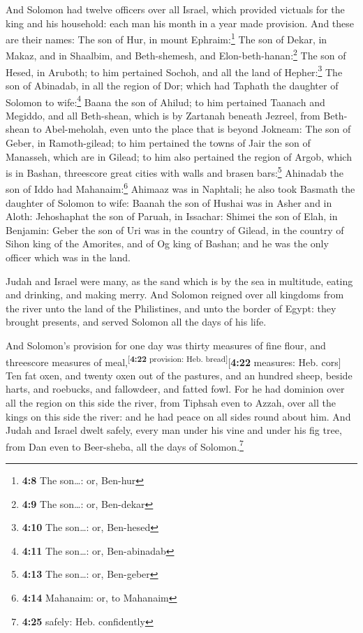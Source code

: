  And Solomon had twelve officers over all Israel, which
provided victuals for the king and his household: each man his month in
a year made provision.  And these are their names: The son
of Hur, in mount Ephraim:\footnote{\textbf{4:8} The son\ldots: or,
  Ben-hur}  The son of Dekar, in Makaz, and in Shaalbim,
and Beth-shemesh, and Elon-beth-hanan:\footnote{\textbf{4:9} The
  son\ldots: or, Ben-dekar}  The son of Hesed, in
Aruboth; to him pertained Sochoh, and all the land of Hepher:\footnote{\textbf{4:10}
  The son\ldots: or, Ben-hesed}  The son of Abinadab, in
all the region of Dor; which had Taphath the daughter of Solomon to
wife:\footnote{\textbf{4:11} The son\ldots: or, Ben-abinadab}
 Baana the son of Ahilud; to him pertained Taanach and
Megiddo, and all Beth-shean, which is by Zartanah beneath Jezreel, from
Beth-shean to Abel-meholah, even unto the place that is beyond Jokneam:
 The son of Geber, in Ramoth-gilead; to him pertained the
towns of Jair the son of Manasseh, which are in Gilead; to him also
pertained the region of Argob, which is in Bashan, threescore great
cities with walls and brasen bars:\footnote{\textbf{4:13} The son\ldots:
  or, Ben-geber}  Ahinadab the son of Iddo had
Mahanaim:\footnote{\textbf{4:14} Mahanaim: or, to Mahanaim}
 Ahimaaz was in Naphtali; he also took Basmath the
daughter of Solomon to wife:  Baanah the son of Hushai
was in Asher and in Aloth:  Jehoshaphat the son of
Paruah, in Issachar:  Shimei the son of Elah, in
Benjamin:  Geber the son of Uri was in the country of
Gilead, in the country of Sihon king of the Amorites, and of Og king of
Bashan; and he was the only officer which was in the land.

 Judah and Israel were many, as the sand which is by the
sea in multitude, eating and drinking, and making merry. 
And Solomon reigned over all kingdoms from the river unto the land of
the Philistines, and unto the border of Egypt: they brought presents,
and served Solomon all the days of his life.

 And Solomon's provision for one day was thirty measures
of fine flour, and threescore measures of
meal,\textsuperscript{{[}\textbf{4:22} provision: Heb.
bread{]}}{[}\textbf{4:22} measures: Heb. cors{]}  Ten fat
oxen, and twenty oxen out of the pastures, and an hundred sheep, beside
harts, and roebucks, and fallowdeer, and fatted fowl. 
For he had dominion over all the region on this side the river, from
Tiphsah even to Azzah, over all the kings on this side the river: and he
had peace on all sides round about him.  And Judah and
Israel dwelt safely, every man under his vine and under his fig tree,
from Dan even to Beer-sheba, all the days of Solomon.\footnote{\textbf{4:25}
  safely: Heb. confidently}

